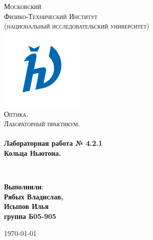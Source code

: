 \documentclass[a4paper,12pt]{article}
\begin{document}
\begin{titlepage}
	\begin{center}
		
		\textsc{\LARGE Московский\\[-0.2cm]Физико-Технический Институт\\[0.1cm]\large (национальный исследовательский университет)}\\[1.5cm] 
		
	\includegraphics[width=0.3\textwidth]{hv_s_no_bg.png}~\\[1cm]

	\textsc{\Large Оптика. \\ Лабораторный практикум. }\\[0.2cm]

	\HRule \\[0.4cm]
	{ \LARGE \bfseries Лабораторная работа № 4.2.1 \\ Кольца Ньютона. \\[0.4cm] }

	\HRule \\[1.5cm]
		
		\noindent
		\begin{minipage}{0.4\textwidth}
			\begin{flushleft} \large
			\end{flushleft}
		\end{minipage}%
		\begin{minipage}{0.4\textwidth}
			\begin{flushright} \large
			\end{flushright}
		\end{minipage}
		
		
		\large{\begin{flushright}
				\vfill
				\textbf{Выполнили}:\\
				\textbf{Рябых Владислав,\\}
				\textbf{Исыпов Илья\\}
				\textbf{группа Б05-905}
		\end{flushright}}
		
		
		{\large \today}\\
		
		
	\end{center}
\end{titlepage}
\end{document}
